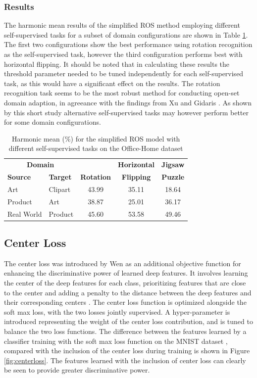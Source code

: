\documentclass[10pt,twocolumn,letterpaper]{article}
\begin{document}
\subsubsection*{Results}

The harmonic mean results of the simplified ROS method employing different self-supervised tasks for a subset of domain configurations are shown in Table \ref{tab:selfs}. The first two configurations show the best performance using rotation recognition as the self-supervised task, however the third configuration performs best with horizontal flipping. It should be noted that in calculating these results the threshold parameter needed to be tuned independently for each self-supervised task, as this would have a significant effect on the results. The rotation recognition task seems to be the most robust method for conducting open-set domain adaption, in agreeance with the findings from Xu \etal \cite{Xu2019} and Gidaris \etal \cite{Gidaris2018}. As shown by this short study alternative self-supervised tasks may however perform better for some domain configurations.

\begin{table}[!htb]
\small
  \centering
  \begin{tabular}{@{}|ll|ccc|@{}}
    \hline
\multicolumn{2}{|c|}{\textbf{Domain}} & & \textbf{Horizontal} & \textbf{Jigsaw} \\
\textbf{Source} & \textbf{Target} & \textbf{Rotation} & \textbf{Flipping} & \textbf{Puzzle} \\ \hline
Art & Clipart & 43.99 & 35.11 & 18.64 \\
Product & Art & 38.87 & 25.01 & 36.17\\
Real World & Product  & 45.60 & 53.58 & 49.46\\
    \hline
  \end{tabular}
  \caption{Harmonic mean (\%) for the simplified ROS model with different self-supervised tasks on the Office-Home dataset}
  \label{tab:selfs}
\end{table}


\subsection{Center Loss}

The center loss was introduced by Wen \etal \cite{Wen2016} as an additional objective function for enhancing the discriminative power of learned deep features. It involves learning the center of the deep features for each class, prioritizing features that are close to the center and adding a penalty to the distance between the deep features and their corresponding centers \cite{Wen2016}. The center loss function is optimized alongside the soft max loss, with the two losses jointly supervised. A hyper-parameter is introduced representing the weight of the center loss contribution, and is tuned to balance the two loss functions. The difference between the features learned by a classifier training with the soft max loss function on the MNIST dataset \cite{MNIST}, compared with the inclusion of the center loss during training is shown in Figure \ref{fig:centerloss}. The features learned with the inclusion of center loss can clearly be seen to provide greater discriminative power.
\end{document}
